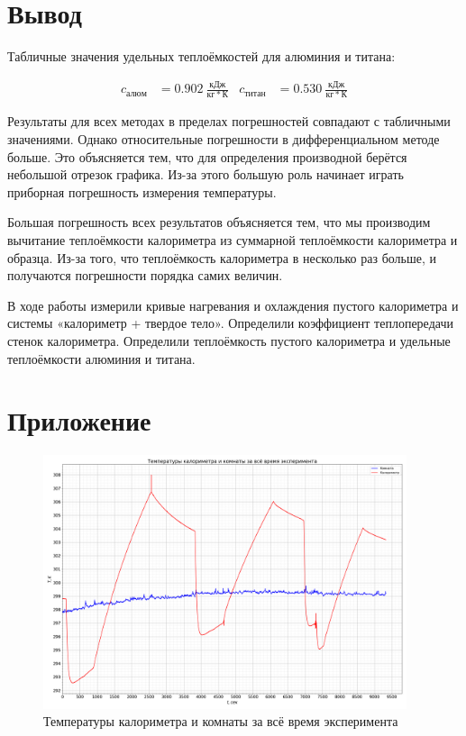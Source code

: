 \documentclass[a4paper, 12pt]{article}
\begin{document}
    \section{Вывод}

        Табличные значения удельных теплоёмкостей для алюминия и титана:

        \begin{align*}
            c_{алюм} &= 0.902~\frac{кДж}{кг*К} & c_{титан} &= 0.530~\frac{кДж}{кг*К}
        \end{align*}

        Результаты для всех методах в пределах погрешностей совпадают с табличными значениями. Однако относительные погрешности в дифференциальном методе больше. Это объясняется тем, что для определения производной берётся небольшой отрезок графика. Из-за этого большую роль начинает играть приборная погрешность измерения температуры.

        Большая погрешность всех результатов объясняется тем, что мы производим вычитание теплоёмкости калориметра из суммарной теплоёмкости калориметра и образца. Из-за того, что теплоёмкость калориметра в несколько раз больше, и получаются погрешности порядка самих величин.

        В ходе работы измерили кривые нагревания и охлаждения пустого калориметра и системы «калориметр + твердое тело». Определили коэффициент теплопередачи стенок калориметра. Определили теплоёмкость пустого калориметра и удельные теплоёмкости алюминия и титана.

    \section{Приложение}

        \begin{figure}[!ht]
            \centering
            \includegraphics[angle=90,width=0.95\textwidth]{"img/graph_all.png"}
            \caption{Температуры калориметра и комнаты за всё время эксперимента}
            \label{plot:all}
        \end{figure}
\end{document}
